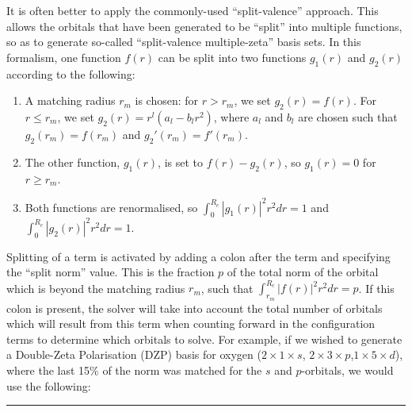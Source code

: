 \documentclass[letterpaper,10pt,english]{sphinxmanual}
\begin{document}
It is often better to apply the commonly-used “split-valence” approach.
This allows the orbitals that have been generated to be “split” into
multiple functions, so as to generate so-called “split-valence
multiple-zeta” basis sets. In this formalism, one function \(f(r)\)
can be split into two functions \(g_{1}(r)\) and \(g_{2}(r)\)
according to the following:
\begin{enumerate}
\item {} 
A matching radius \(r_{m}\) is chosen: for \(r>r_{m}\), we
set \(g_{2}(r)=f(r)\). For \(r\leq r_{m}\), we set
\(g_{2}(r)=r^{l}(a_{l}-b_{l}r^{2})\), where \(a_{l}\) and
\(b_{l}\) are chosen such that \(g_{2}(r_{m})=f(r_{m})\) and
\(g_{2}'(r_{m})=f'(r_{m})\).

\item {} 
The other function, \(g_{1}(r)\), is set to
\(f(r)-g_{2}(r)\), so \(g_{1}(r)=0\) for \(r\geq r_{m}\).

\item {} 
Both functions are renormalised, so
\(\int_{0}^{R_{c}}|g_{1}(r)|^{2}r^{2}dr=1\) and
\(\int_{0}^{R_{c}}|g_{2}(r)|^{2}r^{2}dr=1\).

\end{enumerate}

Splitting of a term is activated by adding a colon after the term and
specifying the “split norm” value. This is the fraction \(p\) of the
total norm of the orbital which is beyond the matching radius
\(r_{m}\), such that
\(\int_{r_{m}}^{R_{c}}|f(r)|^{2}r^{2}dr=p\). If this colon is
present, the solver will take into account the total number of orbitals
which will result from this term  when counting
forward in the configuration terms to determine which orbitals to solve.
For example, if we wished to generate a Double-Zeta Polarisation (DZP)
basis for oxygen (\(2\times1\times s\),
\(2\times3\times p\),\(1\times5\times d\)), where the last 15\%
of the norm was matched for the \(s\) and \(p\)-orbitals, we
would use the following:


\bigskip\hrule\bigskip







\end{document}
